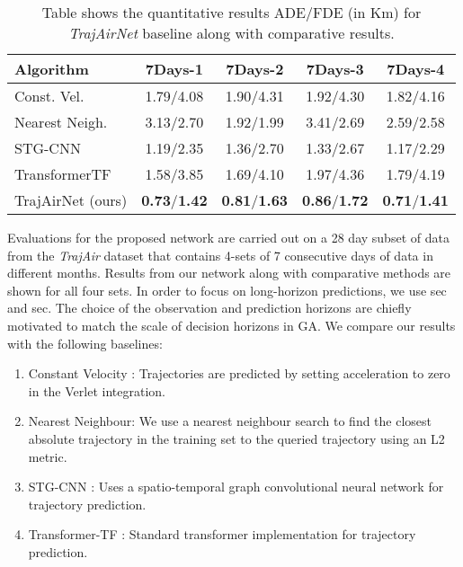 \documentclass[letterpaper, 10 pt, conference]{ieeeconf}
\begin{document}
\begin{table}[!ht]
    \centering
    \begin{tabular}{|l|c|c|c|c|}
    \hline
    \textbf{Algorithm}  & \textbf{7Days-1} & \textbf{7Days-2} & \textbf{7Days-3} & \textbf{7Days-4} \\
\hline 
    Const. Vel.\cite{salzmann2020trajectron++} & 1.79/4.08 & 1.90/4.31 & 1.92/4.30 & 1.82/4.16  \\
    
    Nearest Neigh. & 3.13/2.70 & 1.92/1.99 & 3.41/2.69 & 2.59/2.58   \\
    
    STG-CNN\cite{mohamed2020social} & 1.19/2.35 & 1.36/2.70 & 1.33/2.67 & 1.17/2.29   \\
    TransformerTF\cite{giuliari2021transformer} & 1.58/3.85 & 1.69/4.10  &  1.97/4.36 &  1.79/4.19  \\
    \hline
    TrajAirNet (ours) & \textbf{0.73}/\textbf{1.42} & \textbf{0.81}/\textbf{1.63}&\textbf{0.86}/\textbf{1.72} & \textbf{0.71}/\textbf{1.41} \\  
    \hline
    \end{tabular}
    \caption{Table shows the quantitative results ADE/FDE (in Km) for \textit{TrajAirNet} baseline along with comparative results.}
    \label{tab:results}
\end{table}
Evaluations for the proposed network are carried out on a 28 day subset of data from the \textit{TrajAir} dataset that contains 4-sets of 7 consecutive days of data in different months. Results from our network along with comparative methods are shown for all four sets. In order to focus on long-horizon predictions, we use  sec and  sec. The choice of the observation and prediction horizons are chiefly motivated to match the scale of decision horizons in GA.  
We compare our results with the following baselines:
\begin{enumerate}
    \item Constant Velocity \cite{salzmann2020trajectron++}: Trajectories are predicted by setting acceleration to zero in the Verlet integration.
    \item Nearest Neighbour: We use a nearest neighbour search to find the closest absolute trajectory in the training set to the queried trajectory using an L2 metric. 
    \item STG-CNN \cite{mohamed2020social}: Uses a spatio-temporal graph convolutional neural network for trajectory prediction.  
    \item Transformer-TF  \cite{giuliari2021transformer}: Standard transformer implementation for trajectory prediction.  
\end{enumerate}
\end{document}
